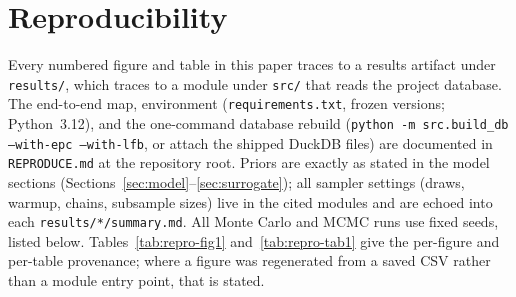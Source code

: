 \section{Reproducibility}
\label{app:repro}

Every numbered figure and table in this paper traces to a results artifact under
\texttt{results/}, which traces to a module under \texttt{src/} that reads the
project database. The end-to-end map, environment (\texttt{requirements.txt},
frozen versions; Python~3.12), and the one-command database rebuild
(\texttt{python -m src.build\_db --with-epc --with-lfb}, or attach the shipped
DuckDB files) are documented in \texttt{REPRODUCE.md} at the repository root.
Priors are exactly as stated in the model sections
(Sections~\ref{sec:model}--\ref{sec:surrogate}); all sampler settings
(draws, warmup, chains, subsample sizes) live in the cited modules and are echoed
into each \texttt{results/*/summary.md}. All Monte Carlo and MCMC runs use fixed
seeds, listed below. Tables~\ref{tab:repro-fig1} and~\ref{tab:repro-tab1} give the
per-figure and per-table provenance; where a figure was regenerated from a saved
CSV rather than a module entry point, that is stated.

